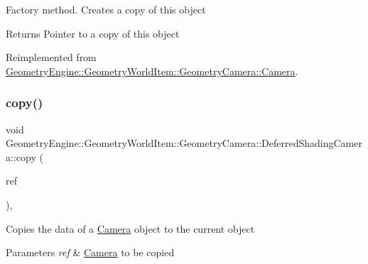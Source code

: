 Factory method. Creates a copy of this object \begin{DoxyReturn}{Returns}
Pointer to a copy of this object 
\end{DoxyReturn}


Reimplemented from \mbox{\hyperlink{class_geometry_engine_1_1_geometry_world_item_1_1_geometry_camera_1_1_camera_a53b37943c1929fde7396c66a36fb3c52}{Geometry\+Engine\+::\+Geometry\+World\+Item\+::\+Geometry\+Camera\+::\+Camera}}.

\mbox{\label{class_geometry_engine_1_1_geometry_world_item_1_1_geometry_camera_1_1_deferred_shading_camera_a00eba99af30625646ea11f442ffa2742}} 
\subsubsection{\texorpdfstring{copy()}{copy()}}
{\footnotesize\ttfamily void Geometry\+Engine\+::\+Geometry\+World\+Item\+::\+Geometry\+Camera\+::\+Deferred\+Shading\+Camera\+::copy (\begin{DoxyParamCaption}\item[{const \mbox{\hyperlink{class_geometry_engine_1_1_geometry_world_item_1_1_geometry_camera_1_1_deferred_shading_camera}{Deferred\+Shading\+Camera}} \&}]{ref }\end{DoxyParamCaption})\hspace{0.3cm}{\ttfamily [protected]}, {\ttfamily [virtual]}}

Copies the data of a \mbox{\hyperlink{class_geometry_engine_1_1_geometry_world_item_1_1_geometry_camera_1_1_camera}{Camera}} object to the current object 
\begin{DoxyParams}{Parameters}
{\em ref} & \mbox{\hyperlink{class_geometry_engine_1_1_geometry_world_item_1_1_geometry_camera_1_1_camera}{Camera}} to be copied \\
\hline
\end{DoxyParams}
\mbox{\label{class_geometry_engine_1_1_geometry_world_item_1_1_geometry_camera_1_1_deferred_shading_camera_aa37bfbf062ca20f0d41d5f29fbbc7959}} 
